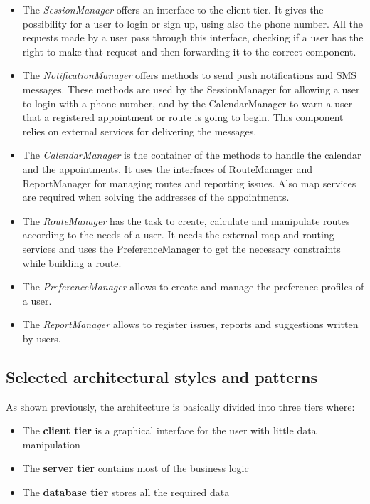 \begin{itemize}
	\item The \emph{SessionManager} offers an interface to the client tier. It gives the possibility for a user to login or sign up, using also the phone number. All the requests made by a user pass through this interface, checking if a user has the right to make that request and then forwarding it to the correct component.
	\item The \emph{NotificationManager} offers methods to send push notifications and SMS messages. These methods are used by the SessionManager for allowing a user to login with a phone number, and by the CalendarManager to warn a user that a registered appointment or route is going to begin. This component relies on external services for delivering the messages.
	\item The \emph{CalendarManager} is the container of the methods to handle the calendar and the appointments. It uses the interfaces of RouteManager and ReportManager for managing routes and reporting issues. Also map services are required when solving the addresses of the appointments.
	\item The \emph{RouteManager} has the task to create, calculate and manipulate routes according to the needs of a user. It needs the external map and routing services and uses the PreferenceManager to get the necessary constraints while building a route.
	\item The \emph{PreferenceManager} allows to create and manage the preference profiles of a user.
	\item The \emph{ReportManager} allows to register issues, reports and suggestions written by users.
\end{itemize}

\subsection{Selected architectural styles and patterns}

As shown previously, the architecture is basically divided into three tiers where:

\begin{itemize}
	\item The \textbf{client tier} is a graphical interface for the user with little data manipulation
	\item The \textbf{server tier} contains most of the business logic
	\item The \textbf{database tier} stores all the required data
\end{itemize}

